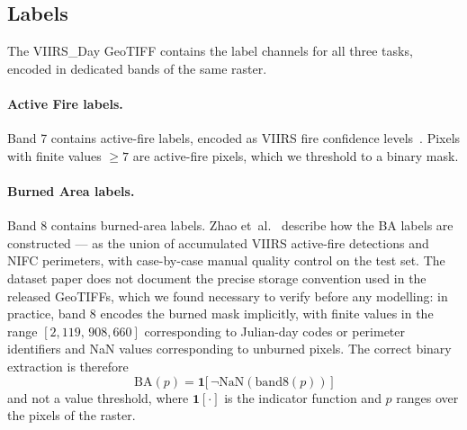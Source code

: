 \documentclass[sensors,article,submit,moreauthors,pdftex]{Definitions/mdpi}
\begin{document}
\subsection{Labels}

The VIIRS\_Day GeoTIFF contains the label channels for all three tasks, encoded in dedicated bands of the same raster.

\paragraph*{Active Fire labels.} Band 7 contains active-fire labels, encoded as VIIRS fire confidence levels~\cite{schroeder2014new}. Pixels with finite values $\geq 7$ are active-fire pixels, which we threshold to a binary mask.

\paragraph*{Burned Area labels.} Band 8 contains burned-area labels. Zhao et~al.~\cite{zhao2025tssatfire} describe how the BA labels are constructed --- as the union of accumulated VIIRS active-fire detections and NIFC perimeters, with case-by-case manual quality control on the test set. The dataset paper does not document the precise storage convention used in the released GeoTIFFs, which we found necessary to verify before any modelling: in practice, band 8 encodes the burned mask implicitly, with finite values in the range $[2{,}119,\,908{,}660]$ corresponding to Julian-day codes or perimeter identifiers and NaN values corresponding to unburned pixels. The correct binary extraction is therefore
\begin{equation}
\mathrm{BA}(p) = \mathbf{1}\bigl[\,\neg \mathrm{NaN}(\mathrm{band8}(p))\,\bigr]
\label{eq:ba}
\end{equation}
and not a value threshold, where $\mathbf{1}[\cdot]$ is the indicator function and
$p$ ranges over the pixels of the raster.
\end{document}
